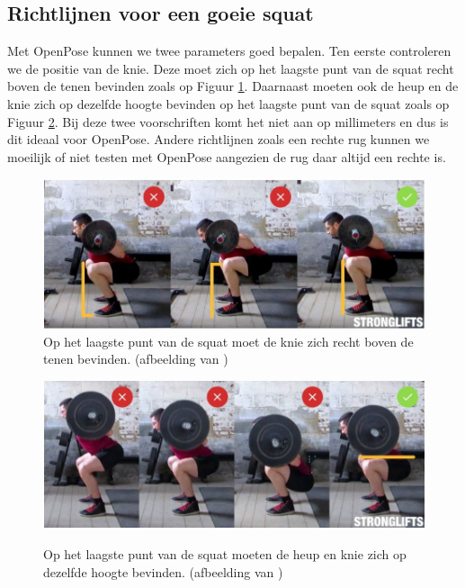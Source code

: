 \documentclass[a4paper,twoside,kulak]{kulakreport}
\begin{document}
\subsection{Richtlijnen voor een goeie squat}

Met OpenPose kunnen we twee parameters goed bepalen.
Ten eerste controleren we de positie van de knie. Deze moet zich op het laagste punt van de squat recht boven de tenen bevinden zoals op Figuur \ref{squat_knie}. Daarnaast moeten ook de heup en de knie zich op dezelfde hoogte bevinden op het laagste punt van de squat zoals op Figuur \ref{squat_heup}. Bij deze twee voorschriften komt het niet aan op millimeters en dus is dit ideaal voor OpenPose. Andere richtlijnen zoals een rechte rug kunnen we moeilijk of niet testen met OpenPose aangezien de rug daar altijd een rechte is.

\begin{figure}[H]
	\includegraphics[width= \textwidth]{squat_knie}
	\caption{Op het laagste punt van de squat moet de knie zich recht boven de tenen bevinden. (afbeelding van \cite{squats})}
	\label{squat_knie}
\end{figure}

\begin{figure}[H]
	\includegraphics[width= \textwidth]{squat_heup}
	\label{squat_heup}
	\caption{Op het laagste punt van de squat moeten de heup en knie zich op dezelfde hoogte bevinden. (afbeelding van \cite{squats})}
\end{figure}
\end{document}
